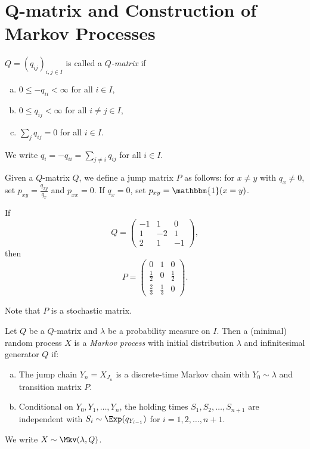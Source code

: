 \documentclass[12pt]{article}
\begin{document}
\newpage

\section{Q-matrix and Construction of Markov Processes}
\label{sec:q_matrix_and_construction_of_markov_processes}

\begin{definition}
	$Q = (q_{ij})_{i,j \in I}$ is called a $Q$\emph{-matrix} if
	\begin{enumerate}[(a)]
		\item $0 \leq -q_{ii} < \infty$ for all $i \in I$,
		\item $0 \leq q_{ij} < \infty$ for all $i \neq j \in I$,
		\item $\sum_{j} q_{ij} = 0$ for all $i \in I$.
	\end{enumerate}
	We write $q_i = -q_{ii} = \sum_{j \neq i}q_{ij}$ for all $i \in I$.

	Given a $Q$-matrix $Q$, we define a jump matrix $P$ as follows: for $x \neq y$ with $q_x \neq 0$, set $p_{xy} = \frac{q_{xy}}{q_x}$ and $p_{x x} = 0$. If $q_x = 0$, set $p_{xy} = \mathbbm{1}(x = y)$.
\end{definition}

\begin{exbox}
	If
	\[
	Q =
	\begin{pmatrix}
		-1 & 1 & 0 \\
		1 & -2 & 1 \\
		2 & 1 & -1
	\end{pmatrix}
	,\]
	then
	\[
	P =
	\begin{pmatrix}
		0 & 1 & 0 \\
		\frac{1}{2} & 0 & \frac{1}{2} \\
		\frac{2}{3} & \frac{1}{3} & 0
	\end{pmatrix}
	.\]
\end{exbox}

Note that $P$ is a stochastic matrix.

\begin{definition}
	Let $Q$ be a $Q$-matrix and $\lambda$ be a probability measure on $I$. Then a (minimal) random process $X$ is a \emph{Markov process} with initial distribution $\lambda$ and infinitesimal generator $Q$ if:
	\begin{enumerate}[(a)]
		\item The jump chain $Y_n = X_{J_n}$ is a discrete-time Markov chain with $Y_0 \sim \lambda$ and transition matrix $P$.
		\item Conditional on $Y_0, Y_1, \ldots, Y_n$, the holding times $S_1, S_2, \ldots, S_{n+1}$ are independent with $S_i \sim \Exp(q_{Y_{i-1}})$ for $i = 1, 2, \ldots, n+1$.
	\end{enumerate}
	We write $X \sim \Mkv(\lambda, Q)$.
\end{definition}
\end{document}
